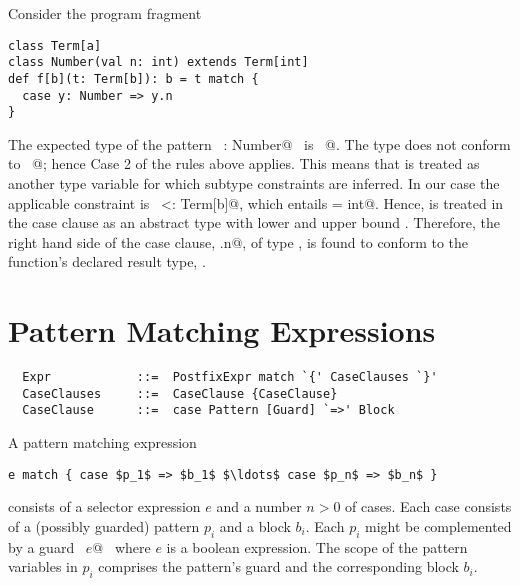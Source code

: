 \example
Consider the program fragment
\begin{lstlisting}
class Term[a]
class Number(val n: int) extends Term[int]
def f[b](t: Term[b]): b = t match {
  case y: Number => y.n
}
\end{lstlisting}
The expected type of the pattern ~\lstinline@y: Number@~ is
~\lstinline@Term[b]@.  The type  does not conform to
~\lstinline@Term[b]@; hence Case 2 of the rules above
applies. This means that \lstinline@b@ is treated as another type
variable for which subtype constraints are inferred. In our case the
applicable constraint is ~\lstinline@Number <: Term[b]@, which
entails \lstinline@b = int@.  Hence, \lstinline@b@ is treated in
the case clause as an abstract type with lower and upper bound
\lstinline@int@. Therefore, the right hand side of the case clause,
\lstinline@y.n@, of type \lstinline@int@, is found to conform to the
function's declared result type, \lstinline@Number@.

\section{Pattern Matching Expressions}
\label{sec:pattern-match}

\syntax\begin{lstlisting}
  Expr            ::=  PostfixExpr match `{' CaseClauses `}'
  CaseClauses     ::=  CaseClause {CaseClause}
  CaseClause      ::=  case Pattern [Guard] `=>' Block
\end{lstlisting}

A pattern matching expression
\begin{lstlisting}
e match { case $p_1$ => $b_1$ $\ldots$ case $p_n$ => $b_n$ }
\end{lstlisting}
consists of a selector expression $e$ and a number $n > 0$ of
cases. Each case consists of a (possibly guarded) pattern $p_i$ and a
block $b_i$. Each $p_i$ might be complemented by a guard
~\lstinline@if $e$@~ where $e$ is a boolean expression. 
The scope of the pattern
variables in $p_i$ comprises the pattern's guard and the corresponding block $b_i$.


